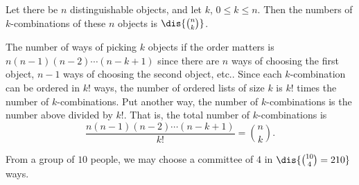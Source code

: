 \begin{thm}
Let there be $n$ distinguishable objects, and let $k$, $0 \leq k
\leq n$. Then the numbers of $k$-combinations of these $n$ objects
is $\dis{\binom{n}{k}}$.
\begin{pf}
The number of ways of picking $k$ objects if the order matters is 
$n(n - 1)(n - 2) \cdots (n - k + 1)$ since there are $n$ ways of choosing the 
first object, $n - 1$ ways of choosing the second object, etc..
Since each $k$-combination can be ordered in $k!$ ways, the number
of ordered lists of size $k$ is $k!$ times the number of $k$-combinations.
Put another way, the number of $k$-combinations is the number above divided by $k!$.  
That is, the total number of $k$-combinations is 
$$ \frac{n(n - 1)(n - 2) \cdots (n - k + 1)}{k!}=  \binom{n}{k}.$$
\end{pf}
\end{thm}

\begin{exa}
From a group of $10$ people, we may choose a committee of $4$ in
$\dis{\binom{10}{4} = 210} $ ways.
\end{exa}


